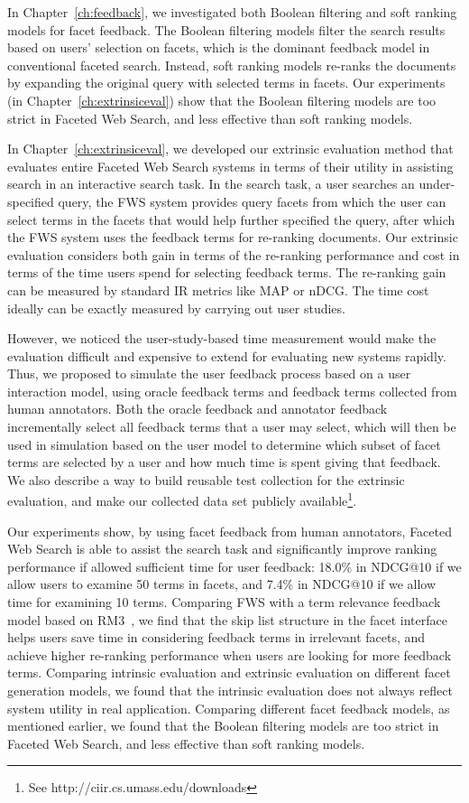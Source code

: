 In Chapter~\ref{ch:feedback}, we investigated both Boolean filtering and soft ranking models for facet feedback. The Boolean filtering models filter the search results based on users' selection on facets, which is the dominant feedback model in conventional faceted search. Instead, soft ranking models re-ranks the documents by expanding the original query with selected terms in facets. Our experiments (in Chapter~\ref{ch:extrinsiceval}) show that the Boolean filtering models are too strict in Faceted Web Search, and less effective than soft ranking models.

In Chapter~\ref{ch:extrinsiceval}, we developed our extrinsic evaluation method that evaluates entire Faceted Web Search systems in terms of their utility in assisting search in an interactive search task. In the search task, a user searches an under-specified query, the FWS system provides query facets from which the user can select terms in the facets that would help further specified the query, after which the FWS system uses the feedback terms for re-ranking documents. Our extrinsic evaluation considers both gain in terms of the re-ranking performance and cost in terms of the time users spend for selecting feedback terms. The re-ranking gain can be measured by standard IR metrics like MAP or nDCG. The time cost ideally can be exactly measured by carrying out user studies. 

However, we noticed the user-study-based time measurement would make the evaluation difficult and expensive to extend for evaluating new systems rapidly. Thus, we proposed to simulate the user feedback process based on a user interaction model, using oracle feedback terms and feedback terms collected from human annotators. Both the oracle feedback and annotator feedback incrementally select all feedback terms that a user may select, which will then be used in simulation based on the user model to determine which subset of facet terms are selected by a user and how much time is spent giving that feedback. We also describe a way to build reusable test collection for the extrinsic evaluation, and make our collected data set publicly available\footnote{See http://ciir.cs.umass.edu/downloads}.

Our experiments show, by using facet feedback from human annotators, Faceted Web Search is able to assist the search task and significantly improve ranking performance if allowed sufficient time for user feedback: 18.0\% in NDCG@10 if we allow users to examine 50 terms in facets, and 7.4\% in NDCG@10 if we allow time for examining 10 terms. Comparing FWS with a term relevance feedback model based on RM3~\cite{abdul2004umass,lavrenko2001relevance}, we find that the skip list structure in the facet interface helps users save time in considering feedback terms in irrelevant facets, and achieve higher re-ranking performance when users are looking for more feedback terms. Comparing intrinsic evaluation and extrinsic evaluation on different facet generation models, we found that the intrinsic evaluation does not always reflect system utility in real application. Comparing different facet feedback models, as mentioned earlier, we found that the Boolean filtering models are too strict in Faceted Web Search, and less effective than soft ranking models.


